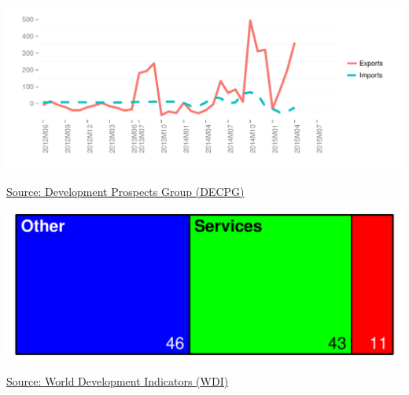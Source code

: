 \documentclass{article}\usepackage[]{graphicx}\usepackage[]{color}
\makeatletter
\def\maxwidth{ %
  \ifdim\Gin@nat@width>\linewidth
    \linewidth
  \else
    \Gin@nat@width
  \fi
}
\makeatother
\begin{document}
\begin{minipage}[b]{0.99\textwidth}
\begin{minipage}[b]{\textwidth}
\begin{minipage}[c]{0.49\textwidth}
{\centering \includegraphics[width=\maxwidth]{figure/ExpImp_HF-1} 

}



    \vspace*{-0.3cm}
    \raggedright{\footnotesize{\href{http://web.worldbank.org/WBSITE/EXTERNAL/EXTDEC/EXTDECPROSPECTS/0,,menuPK:476941~pagePK:51084723~piPK:51084722~theSitePK:476883,00.html}{Source: Development Prospects Group (DECPG)}}}
    \end{minipage}
    \begin{minipage}[c]{0.49\textwidth} %


{\centering \includegraphics[width=\maxwidth]{figure/GVA_Treemap-1} 

}



   \raggedright{\footnotesize{\href{http://data.worldbank.org/data-catalog/world-development indicators}{Source: World Development Indicators (WDI)}}}
    \end{minipage}
  \end{minipage}  
\end{minipage}   
 
\end{document}

